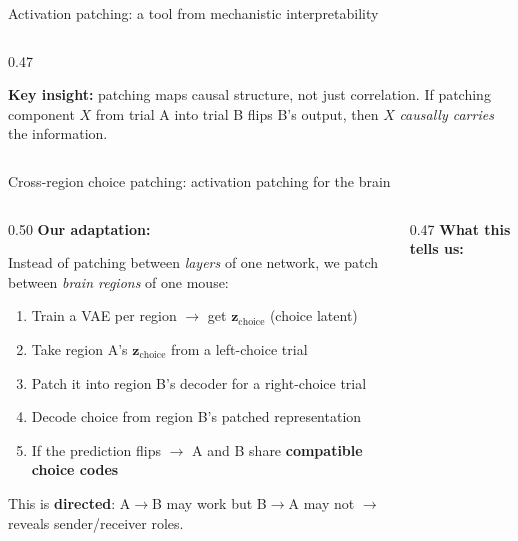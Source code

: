 \documentclass[aspectratio=169,11pt]{beamer}
\begin{document}
\begin{frame}{Activation patching: a tool from mechanistic interpretability}
\begin{columns}[T]
\begin{column}{0.47\textwidth}

\vspace{0.5em}
{\small \textbf{Key insight:} patching maps causal structure, not just correlation. If patching component $X$ from trial A into trial B flips B's output, then $X$ \emph{causally carries} the information.}
\end{column}
\end{columns}
\end{frame}

\begin{frame}{Cross-region choice patching: activation patching for the brain}

\begin{columns}[T]
\begin{column}{0.50\textwidth}
\textbf{Our adaptation:}

\vspace{0.3em}
{\small Instead of patching between \emph{layers} of one network, we patch between \emph{brain regions} of one mouse:}

\vspace{0.3em}
{\small
\begin{enumerate}\setlength\itemsep{0.3em}
  \item Train a VAE per region $\to$ get $\mathbf{z}_{\text{choice}}$ (choice latent)
  \item Take region A's $\mathbf{z}_{\text{choice}}$ from a left-choice trial
  \item Patch it into region B's decoder for a right-choice trial
  \item Decode choice from region B's patched representation
  \item If the prediction flips $\to$ A and B share \textbf{compatible choice codes}
\end{enumerate}
}

\vspace{0.3em}
{\small This is \textbf{directed}: A$\to$B may work but B$\to$A may not $\to$ reveals sender/receiver roles.}
\end{column}

\begin{column}{0.47\textwidth}
\vspace{0.5em}
\textbf{What this tells us:}


\end{column}
\end{columns}
\end{frame}
\end{document}
